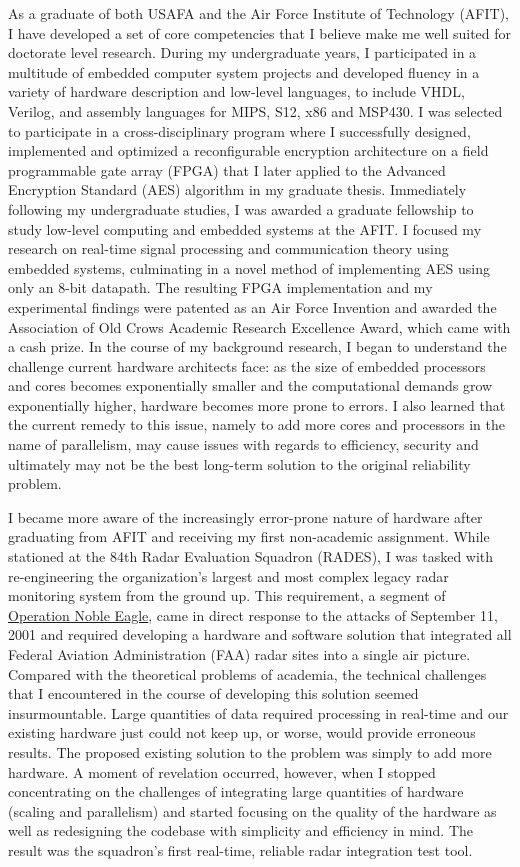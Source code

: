 \documentclass{article}
\begin{document}
As a graduate of both USAFA and the Air Force Institute of Technology
(AFIT), I have developed a set of core competencies that I believe make me well
suited for doctorate level research. During my undergraduate years, I
participated in a multitude of embedded computer system projects and developed fluency in a
variety of hardware description and low-level languages, to include VHDL,
Verilog, and assembly languages for MIPS, S12, x86 and MSP430. I was
selected to participate in a cross-disciplinary
program where I successfully designed, implemented and optimized a
reconfigurable encryption architecture on a field programmable gate array
(FPGA) that I later applied to the Advanced Encryption Standard (AES) algorithm
in my graduate thesis. Immediately following my undergraduate studies, I was
awarded a graduate fellowship to study low-level computing and embedded systems
at the AFIT. I focused my research on real-time
signal processing and communication theory using embedded systems, culminating
in a novel method of implementing AES using only an 8-bit datapath.  The
resulting FPGA implementation and my experimental findings were patented as an Air Force
Invention and awarded the Association of Old Crows Academic Research Excellence
Award, which came with a cash prize. In the course of my background research, I
began to understand the challenge current hardware architects face: as the size
of embedded processors and cores becomes exponentially smaller and the
computational demands grow exponentially higher, hardware becomes more prone to 
errors. I also learned that the current remedy to this issue, namely to add
more cores and processors in the name of parallelism, may cause issues with
regards to efficiency, security and ultimately may not be the best long-term
solution to the original reliability problem.

I became more aware of the increasingly error-prone nature of hardware after
graduating from AFIT and receiving my first non-academic assignment. While
stationed at the 84th Radar Evaluation Squadron (RADES), I was tasked with
re-engineering the organization's largest and most complex legacy radar
monitoring system from the ground up. This requirement, a segment of
\href{http://en.wikipedia.org/wiki/Operation_Noble_Eagle}{Operation Noble
Eagle}, came in direct response to the attacks of September 11, 2001 and
required developing a hardware and software solution that integrated all
Federal Aviation Administration (FAA) radar sites into a single air picture.
Compared with the theoretical problems of academia, the technical challenges that I
encountered in the course of developing this solution seemed insurmountable.
Large quantities of data required processing in real-time and our existing
hardware just could not keep up, or worse, would provide erroneous results. The
proposed existing solution to the problem was simply to add more hardware. A moment of
revelation occurred, however, when I
stopped concentrating on the challenges of integrating large quantities of hardware (scaling and parallelism) and
started focusing on the quality of the hardware as well as redesigning the
codebase with simplicity and efficiency in mind. The result was the squadron's
first real-time, reliable radar integration test tool.
\end{document}
